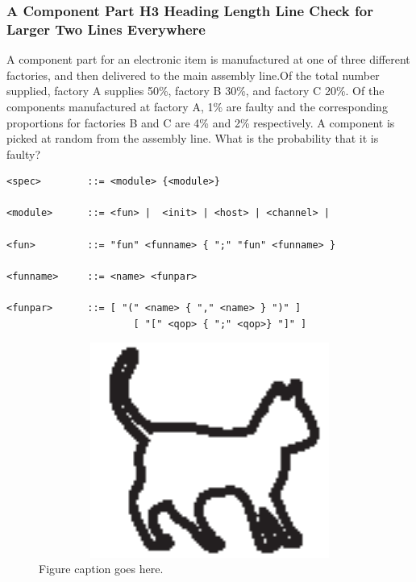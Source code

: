 \subsubsection{A Component Part H3 Heading Length Line Check for Larger Two Lines Everywhere}
A component part for an electronic item is
manufactured at one of three different factories, and then delivered to
the main assembly line.Of the total number supplied, factory A supplies
50\%, factory B 30\%, and factory C 20\%. Of the components
manufactured at factory A, 1\% are faulty and the corresponding
proportions for factories B and C are 4\% and 2\% respectively. A
component is picked at random from the assembly line. What is the
probability that it is faulty? 
\begin{verbatim}
<spec>        ::= <module> {<module>}   

<module>      ::= <fun> |  <init> | <host> | <channel> |

<fun>         ::= "fun" <funname> { ";" "fun" <funname> }

<funname>     ::= <name> <funpar> 

<funpar>      ::= [ "(" <name> { "," <name> } ")" ] 
                      [ "[" <qop> { ";" <qop>} "]" ]
\end{verbatim}

\begin{figure}
\includegraphics[width=350pt, height=200pt]{Chapters/chapter1/figures/cat.eps}
\caption[List of figure caption goes here]{Figure caption goes here.}
\end{figure}



